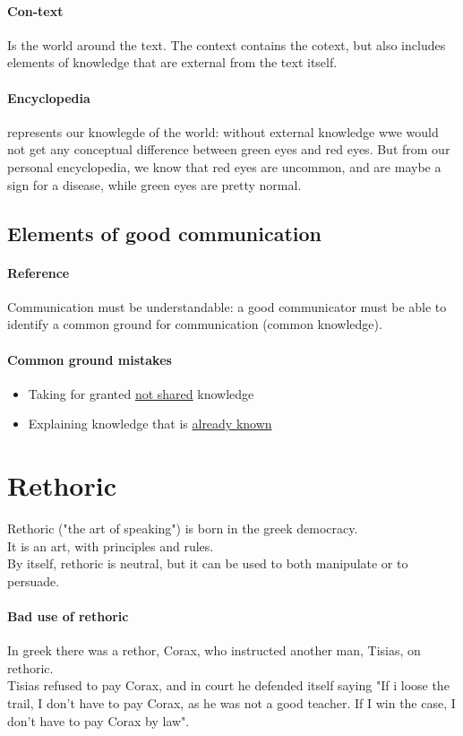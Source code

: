 \documentclass{article}
\begin{document}
\paragraph{Con-text} Is the world around the text. The context contains the cotext, but also includes elements of knowledge that are external from the text itself.
\paragraph{Encyclopedia} represents our knowlegde of the world: without external knowledge wwe would not get any conceptual difference between green eyes and red eyes. But from our personal encyclopedia, we know that red eyes are uncommon, and are maybe a sign for a disease, while green eyes are pretty normal.

\subsection{Elements of good communication}
\paragraph{Reference} Communication must be understandable: a good communicator must be able to identify a common ground for communication (common knowledge).
\paragraph{Common ground mistakes}
\begin{itemize}
\item Taking for granted \underline{not shared} knowledge
\item Explaining knowledge that is \underline{already known}
\end{itemize}




\section{Rethoric}
Rethoric ("the art of speaking") is born in the greek democracy.\\
It is an art, with principles and rules.\\
By itself, rethoric is neutral, but it can be used to both manipulate or to persuade.\\
\paragraph{Bad use of rethoric} In greek there was a rethor, Corax, who instructed another man, Tisias, on rethoric.\\
Tisias refused to pay Corax, and in court he defended itself saying "If i loose the trail, I don't have to pay Corax, as he was not a good teacher. If I win the case, I don't have to pay Corax by law".
\end{document}
